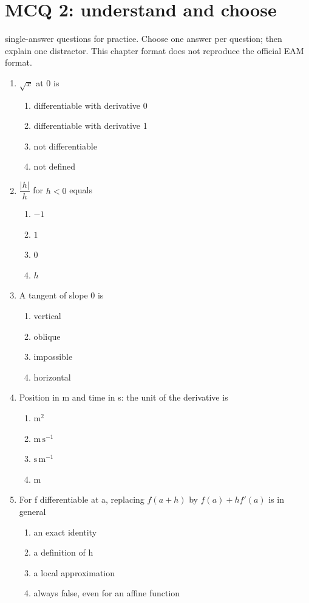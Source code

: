 \endgroup
\begingroup\small
{}\section*{MCQ 2: understand and choose}\label{C04-Q2}
 single-answer questions for practice. Choose one answer per question; then explain one distractor. This chapter format does not reproduce the official EAM format.
\begin{enumerate}
\item $\sqrt{x}$ at 0 is
\begin{enumerate}[label=\Alph*.,itemsep=2pt]
\item differentiable with derivative 0
\item differentiable with derivative 1
\item not differentiable
\item not defined
\end{enumerate}
\item $\dfrac{|h|}{h}$ for $h<0$ equals
\begin{enumerate}[label=\Alph*.,itemsep=2pt]
\item $-1$
\item $1$
\item $0$
\item $h$
\end{enumerate}
\item A tangent of slope 0 is
\begin{enumerate}[label=\Alph*.,itemsep=2pt]
\item vertical
\item oblique
\item impossible
\item horizontal
\end{enumerate}
\item Position in m and time in s: the unit of the derivative is
\begin{enumerate}[label=\Alph*.,itemsep=2pt]
\item $\mathrm{m^2}$
\item $\mathrm{m\,s^{-1}}$
\item $\mathrm{s\,m^{-1}}$
\item $\mathrm{m}$
\end{enumerate}
\item For f differentiable at a, replacing $f(a+h)$ by $f(a)+hf\prime(a)$ is in general
\begin{enumerate}[label=\Alph*.,itemsep=2pt]
\item an exact identity
\item a definition of h
\item a local approximation
\item always false, even for an affine function
\end{enumerate}
\end{enumerate}
